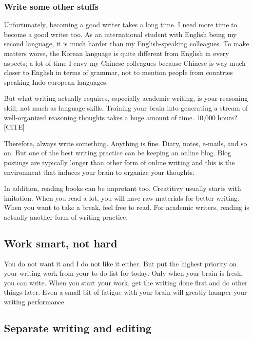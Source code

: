 \documentclass[11pt]{article}
\begin{document}

\subsubsection{Write some other stuffs}
Unfortunately, becoming a good writer takes a long time. I need
more time to become a good writer too. As an international student
with English being my second language, it is much harder than my
English-speaking colleagues. To make matters worse, the Korean
language is quite different from English in every aspects; a lot
of time I envy my Chinese colleagues because Chinese is way much
closer to English in terms of grammar, not to mention people from
countries speaking Indo-european languages.

But what writing actually requires, especially academic writing,
is your reasoning skill, not much as language skills. Training
your brain into generating a stream of well-organized reasoning
thoughts takes a huge amount of time. 10,000 hours? [CITE]

Therefore, always write something. Anything is fine. Diary, notes,
e-mails, and so on. But one of the best writing practice can be
keeping an online blog.  Blog postings are typically longer than
other form of online writing and this is the environment that
induces your brain to organize your thoughts. 

In addition, reading books can be improtant too. Creatitivy
usually starts with imitation. When you read a lot, you will have
raw materials for better writing.  When you want to take a break,
feel free to read. For academic writers, reading is actually
another form of writing practice.

\subsection{Work smart, not hard}

You do not want it and I do not like it either. But put the
highest priority on your writing work from your to-do-list for
today. Only when your brain is fresh, you can write. When you
start your work, get the writing done first and do other things
later. Even a small bit of fatigue with your brain will greatly
hamper your writing performance.

\subsection{Separate writing and editing}
\end{document}
